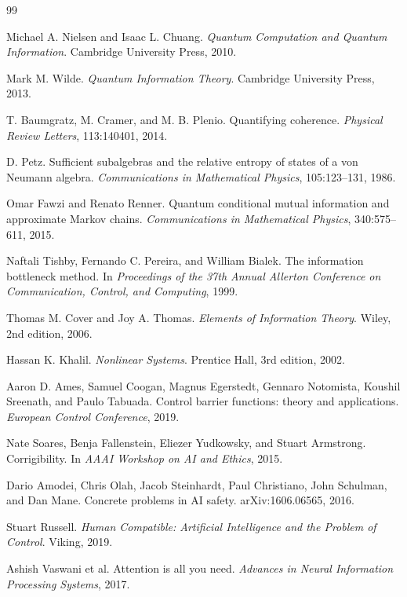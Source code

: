 \documentclass[11pt]{article}
\newcommand{\1}{\mathbf{1}}
\begin{document}
\begin{thebibliography}{99}

Michael A. Nielsen and Isaac L. Chuang.
\newblock \emph{Quantum Computation and Quantum Information}.
\newblock Cambridge University Press, 2010.

Mark M. Wilde.
\newblock \emph{Quantum Information Theory}.
\newblock Cambridge University Press, 2013.

T. Baumgratz, M. Cramer, and M. B. Plenio.
\newblock Quantifying coherence.
\newblock \emph{Physical Review Letters}, 113:140401, 2014.

D. Petz.
\newblock Sufficient subalgebras and the relative entropy of states of a von Neumann algebra.
\newblock \emph{Communications in Mathematical Physics}, 105:123--131, 1986.

Omar Fawzi and Renato Renner.
\newblock Quantum conditional mutual information and approximate Markov chains.
\newblock \emph{Communications in Mathematical Physics}, 340:575--611, 2015.

Naftali Tishby, Fernando C. Pereira, and William Bialek.
\newblock The information bottleneck method.
\newblock In \emph{Proceedings of the 37th Annual Allerton Conference on Communication, Control, and Computing}, 1999.

Thomas M. Cover and Joy A. Thomas.
\newblock \emph{Elements of Information Theory}.
\newblock Wiley, 2nd edition, 2006.

Hassan K. Khalil.
\newblock \emph{Nonlinear Systems}.
\newblock Prentice Hall, 3rd edition, 2002.

Aaron D. Ames, Samuel Coogan, Magnus Egerstedt, Gennaro Notomista, Koushil Sreenath, and Paulo Tabuada.
\newblock Control barrier functions: theory and applications.
\newblock \emph{European Control Conference}, 2019.

Nate Soares, Benja Fallenstein, Eliezer Yudkowsky, and Stuart Armstrong.
\newblock Corrigibility.
\newblock In \emph{AAAI Workshop on AI and Ethics}, 2015.

Dario Amodei, Chris Olah, Jacob Steinhardt, Paul Christiano, John Schulman, and Dan Mane.
\newblock Concrete problems in AI safety.
\newblock arXiv:1606.06565, 2016.

Stuart Russell.
\newblock \emph{Human Compatible: Artificial Intelligence and the Problem of Control}.
\newblock Viking, 2019.

Ashish Vaswani et al.
\newblock Attention is all you need.
\newblock \emph{Advances in Neural Information Processing Systems}, 2017.

\end{thebibliography}
\end{document}
